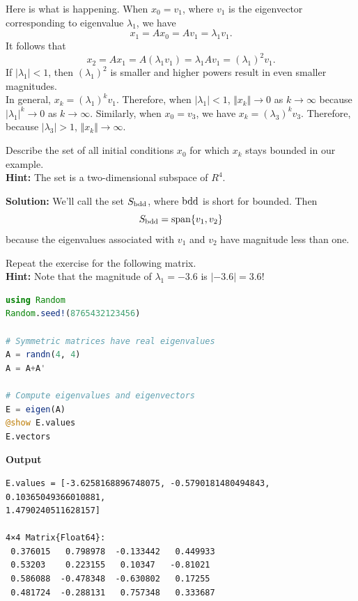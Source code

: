 Here is what is happening. When $x_0 = v_1$, where $v_1$ is the eigenvector corresponding to eigenvalue $\lambda_1$, we have $$x_1 = A x_0 = A v_1 = \lambda_1 v_1.$$ It follows that $$x_2 = A x_1 =  A (\lambda_1 v_1) = \lambda_1 A v_1 = (\lambda_1)^2 v_1.$$  
If $|\lambda_1| < 1$, then $(\lambda_1)^2$ is smaller and higher powers result in even smaller magnitudes.\\

In general, $x_k =  (\lambda_1)^k v_1$. Therefore, when $|\lambda_1| < 1$, $\Vert x_{k} \Vert \rightarrow 0$  as $k \rightarrow \infty$ because $|\lambda_1|^k \rightarrow 0 $ as $k \rightarrow \infty$.  Similarly, when $x_0 = v_3$, we have  $x_k =  (\lambda_3)^k v_3$. Therefore, because $|\lambda_3| > 1$, $\Vert x_{k} \Vert \rightarrow \infty$.

\begin{exercise}
Describe the set of all initial conditions $x_0$ for which $x_k$ stays bounded in our example. \\

\textbf{Hint:} The set is a two-dimensional subspace of $R^4$. \\

\end{exercise}

\textbf{Solution:} We'll call the set $S_{\rm bdd}$, where $\rm bdd$ is short for bounded. Then $$S_{\rm bdd} = \mathrm{span} \{ v_1, v_2 \} $$
because the eigenvalues associated with $v_1$ and $v_2$ have magnitude less than one. 
\Qed

\begin{exercise}
Repeat the exercise for the following matrix. \\


\textbf{Hint:} Note that the magnitude of $\lambda_1 = -3.6$ is $|-3.6| = 3.6$!

\begin{lstlisting}[language=Julia,style=mystyle]
using Random
Random.seed!(8765432123456)

# Symmetric matrices have real eigenvalues
A = randn(4, 4)
A = A+A'

# Compute eigenvalues and eigenvectors
E = eigen(A)
@show E.values
E.vectors
\end{lstlisting}
\textbf{Output} 
\begin{verbatim}
E.values = [-3.6258168896748075, -0.5790181480494843, 0.10365049366010881,
1.4790240511628157]

4×4 Matrix{Float64}:
 0.376015   0.798978  -0.133442   0.449933
 0.53203    0.223155   0.10347   -0.81021
 0.586088  -0.478348  -0.630802   0.17255
 0.481724  -0.288131   0.757348   0.333687
\end{verbatim}

\end{exercise}

